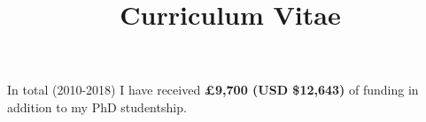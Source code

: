 \documentclass[a4paper,skipsamekey,11pt,british]{curve}
\title{Curriculum Vitae}
\begin{document}
\makeheaders[c]

%    
%

\newpage
{}
In total (2010-2018) I have received \textbf{£9,700 (USD \$12,643)} of funding in addition to my PhD studentship. 
\par \hfill
{}
\newpage



\end{document}
